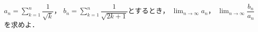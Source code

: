 \documentclass[../../main.tex]{subfiles}
\begin{document}
$\displaystyle a_n=\sum_{k=1}^n\dfrac{1}{\sqrt{k}}$，
$\displaystyle b_n=\sum_{k=1}^n\dfrac{1}{\sqrt{2k+1}}$とするとき，
$\displaystyle \lim_{n\to\infty}a_n$，
$\displaystyle \lim_{n\to\infty}\dfrac{b_n}{a_n}$を求めよ．
\end{document}
